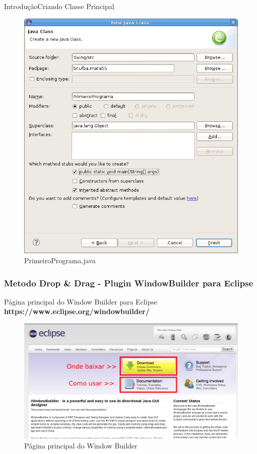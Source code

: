 \documentclass[10pt]{beamer}
\begin{document}
\begin{frame}{Introdução}{Criando Classe Principal}
  \begin{figure}[!htb]
    \centering
    \includegraphics[scale=0.25]{criando_primeiro_programa}
    \caption{PrimeiroPrograma.java}
    \label{figRotulo}
  \end{figure}
\end{frame}{}

\subsubsection{Metodo Drop \& Drag - Plugin WindowBuilder para Eclipse}
\begin{frame}{Página principal do Window Builder para Eclipse}
\textbf{https://www.eclipse.org/windowbuilder/}
  \begin{figure}[!htb]
    \centering
    \includegraphics[scale=.4]{pag_principal_window_builder}
    \caption{Página principal do Window Builder}
    \label{figRotulo}
  \end{figure}
\end{frame}{}
\end{document}
